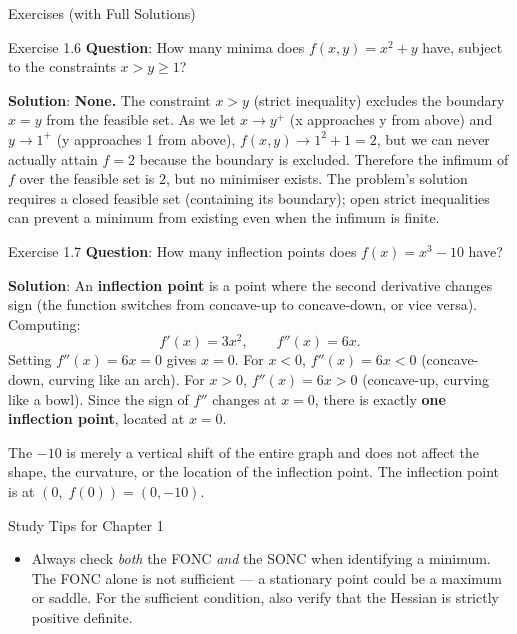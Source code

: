 \documentclass[aspectratio=169,10pt]{beamer}
\begin{document}
\begin{frame}[allowframebreaks]{Exercises (with Full Solutions)}
  \begin{block}{Exercise 1.6}
    \textbf{Question}: How many minima does $f(x, y) = x^2 + y$ have,
    subject to the constraints $x > y \geq 1$?

    \medskip
    \textbf{Solution}: \textbf{None.}  The constraint $x > y$ (strict
    inequality) excludes the boundary $x = y$ from the feasible set.
    As we let $x \to y^+$ (x approaches y from above) and $y \to 1^+$
    (y approaches 1 from above), $f(x, y) \to 1^2 + 1 = 2$, but we can
    never actually attain $f = 2$ because the boundary is excluded.
    Therefore the infimum of $f$ over the feasible set is $2$, but no
    minimiser exists.  The problem's solution requires a closed feasible
    set (containing its boundary); open strict inequalities can prevent a
    minimum from existing even when the infimum is finite.
  \end{block}

  \framebreak

  \begin{block}{Exercise 1.7}
    \textbf{Question}: How many inflection points does $f(x) = x^3 - 10$ have?

    \medskip
    \textbf{Solution}: An \textbf{inflection point} is a point where the
    second derivative changes sign (the function switches from concave-up to
    concave-down, or vice versa).  Computing:
    \[
      f'(x) = 3x^2, \qquad f''(x) = 6x.
    \]
    Setting $f''(x) = 6x = 0$ gives $x = 0$.
    For $x < 0$, $f''(x) = 6x < 0$ (concave-down, curving like an arch).
    For $x > 0$, $f''(x) = 6x > 0$ (concave-up, curving like a bowl).
    Since the sign of $f''$ changes at $x = 0$, there is exactly
    \textbf{one inflection point}, located at $x = 0$.

    \medskip
    The $-10$ is merely a vertical shift of the entire graph and does not
    affect the shape, the curvature, or the location of the inflection point.
    The inflection point is at $(0,\; f(0)) = (0, -10)$.
  \end{block}

  \vspace{0.5em}

  \begin{exampleblock}{Study Tips for Chapter 1}
    \begin{itemize}
      \item Always check \emph{both} the FONC \emph{and} the SONC when
        identifying a minimum.  The FONC alone is not sufficient --- a
        stationary point could be a maximum or saddle.  For the sufficient
        condition, also verify that the Hessian is strictly positive definite.


\end{itemize}
\end{exampleblock}
\end{frame}
\end{document}
